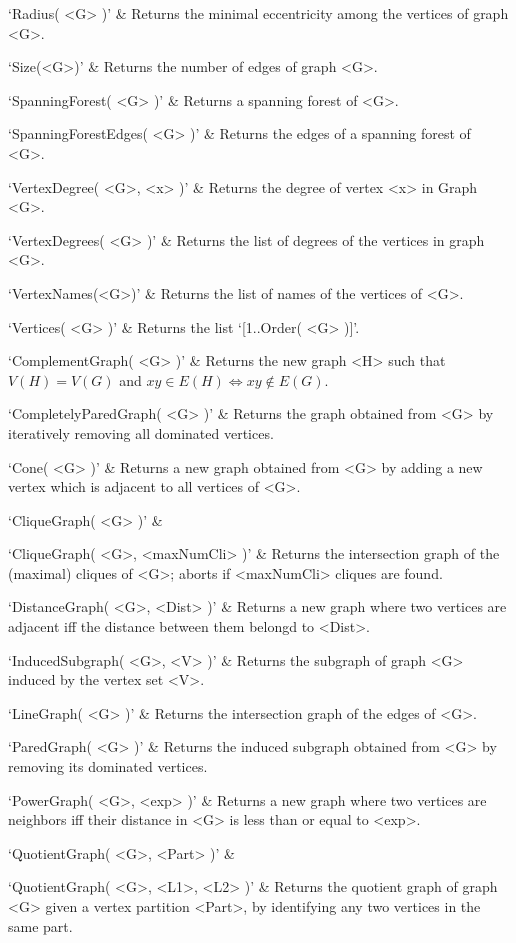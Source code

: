 `Radius( <G> )' & 
Returns the minimal eccentricity among the vertices of graph <G>.

`Size(<G>)' & 
Returns the number of edges of graph <G>.

`SpanningForest( <G> )' & 
Returns a spanning forest of <G>.

`SpanningForestEdges( <G> )' & 
Returns the edges of a spanning forest of <G>.

`VertexDegree( <G>, <x> )' & 
Returns the degree of vertex <x> in Graph <G>.

`VertexDegrees( <G> )' & 
Returns the list of degrees of the vertices in graph <G>.

`VertexNames(<G>)' & 
Returns  the  list of names of the vertices of <G>.

`Vertices( <G> )' & 
Returns the list `[1..Order( <G> )]'.
\enditems


\beginitems
`ComplementGraph( <G> )' & 
Returns the new graph <H> such that  $V(H)=V(G)$ and $xy\in E(H) \iff xy \not\in E(G)$.

`CompletelyParedGraph( <G> )' & 
Returns the graph obtained from <G> by iteratively removing all dominated vertices. 

`Cone( <G> )' & 
Returns a new graph obtained from <G> by adding a new vertex which is adjacent to all vertices of <G>.

`CliqueGraph( <G> )' &

`CliqueGraph( <G>, <maxNumCli> )' & 
Returns the intersection graph of the (maximal) cliques of <G>; aborts if <maxNumCli> cliques are found.

`DistanceGraph( <G>, <Dist> )' & 
Returns a new graph where two vertices are adjacent iff the distance between them belongd to <Dist>.

`InducedSubgraph( <G>, <V> )' & 
Returns the subgraph of graph <G> induced by the vertex set <V>.

`LineGraph( <G> )' & 
Returns the intersection graph of the edges of <G>.

`ParedGraph( <G> )' & 
Returns the induced subgraph obtained from   <G>  by  removing  its  dominated  vertices.

`PowerGraph( <G>, <exp> )' & 
Returns a new graph where two vertices are neighbors iff their distance in <G> is less than or equal to <exp>.

`QuotientGraph( <G>, <Part> )' & 

`QuotientGraph( <G>, <L1>, <L2> )' & 
Returns the quotient graph of graph <G> given a vertex partition <Part>, by identifying any two vertices in the same part.


